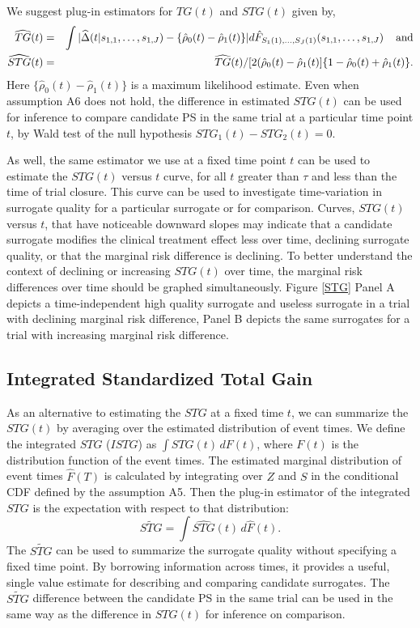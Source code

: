 \documentclass[times, doublespace]{simauth}
\begin{document}
We suggest plug-in estimators for $TG(t)$ and $STG(t)$ given by, 
\begin{eqnarray}
\widehat{TG}(t)&=&\int{|\widehat{\Delta}(t|s_{1,1}, \dots, s_{1,J}) -\{\hat{\rho}_0(t) -\hat{\rho}_1(t)\}|d\hat{F}_{S_1(1), \ldots, S_J(1)}(s_{1,1}, \dots, s_{1,J})} \hspace{4mm} \mbox{and} \label{TG} \\
\widehat{STG}(t)&=&\widehat{TG}(t)/[2(\hat{\rho}_0(t) - \hat{\rho}_1(t)]\{1-\hat{\rho}_0(t) + \hat{\rho}_1(t)\}.
\end{eqnarray}
Here $\{\hat{\rho}_0(t) -\hat{\rho}_1(t)\}$ is a maximum likelihood estimate. Even when assumption A6 does not hold, the difference in estimated $STG(t)$ can be used for inference to compare candidate PS in the same trial at a particular time point $t$, by Wald test of the null hypothesis $STG_1(t)-STG_2(t)=0$. 

As well, the same estimator we use at a fixed time point $t$ can be used to estimate the $STG(t)$ versus $t$ curve, for all $t$ greater than $\tau$ and less than the time of trial closure. This curve can be used to investigate time-variation in surrogate quality for a particular surrogate or for comparison. Curves, $STG(t)$ versus $t$, that have noticeable downward slopes may indicate that a candidate surrogate modifies the clinical treatment effect less over time, declining surrogate quality, or that the marginal risk difference is declining. To better understand the context of declining or increasing $STG(t)$ over time, the marginal risk differences over time should be graphed simultaneously. Figure \ref{STG} Panel A depicts a time-independent high quality surrogate and useless surrogate in a trial with declining marginal risk difference, Panel B depicts the same surrogates for a trial with increasing marginal risk difference. 

\subsection{Integrated Standardized Total Gain} \label{ISTG}
As an alternative to estimating the $STG$ at a fixed time $t$, we can summarize the $STG(t)$ by averaging over the estimated distribution of event times. We define the integrated $STG$ ($ISTG$) as $\int STG(t) \, dF(t)$, where $F(t)$ is the distribution function of the event times. The estimated marginal distribution of event times $\hat{F}(T)$ is calculated by integrating over $Z$ and $S$ in the conditional CDF defined by the assumption A5. Then the plug-in estimator of the integrated $STG$ is the expectation with respect to that distribution:
\[
 \widetilde{STG} = \int \widehat{STG}(t) \, d \hat{F}(t). 
\]
The $\widetilde{STG}$ can be used to summarize the surrogate quality without specifying a fixed time point. By borrowing information across times, it provides a useful, single value estimate for describing and comparing candidate surrogates. The $\widetilde{STG}$ difference between the candidate PS in the same trial can be used in the same way as the difference in $STG(t)$ for inference on comparison.
\end{document}
